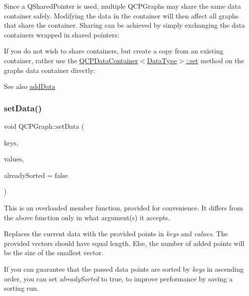 Since a Q\+Shared\+Pointer is used, multiple Q\+C\+P\+Graphs may share the same data container safely. Modifying the data in the container will then affect all graphs that share the container. Sharing can be achieved by simply exchanging the data containers wrapped in shared pointers\+: 
\begin{DoxyCodeInclude}
\end{DoxyCodeInclude}
 If you do not wish to share containers, but create a copy from an existing container, rather use the \hyperlink{class_q_c_p_data_container_ae7042bd534fc3ce7befa2ce3f790b5bf}{Q\+C\+P\+Data\+Container$<$\+Data\+Type$>$\+::set} method on the graph\textquotesingle{}s data container directly\+: 
\begin{DoxyCodeInclude}
\end{DoxyCodeInclude}
 \begin{DoxySeeAlso}{See also}
\hyperlink{class_q_c_p_graph_ae0555c0d3fe0fa7cb8628f88158d420f}{add\+Data} 
\end{DoxySeeAlso}
\mbox{\label{class_q_c_p_graph_a73578d786532132310a926c3cd529b29}} 
\subsubsection{\texorpdfstring{set\+Data()}{setData()}\hspace{0.1cm}{\footnotesize\ttfamily [2/2]}}
{\footnotesize\ttfamily void Q\+C\+P\+Graph\+::set\+Data (\begin{DoxyParamCaption}\item[{const Q\+Vector$<$ double $>$ \&}]{keys,  }\item[{const Q\+Vector$<$ double $>$ \&}]{values,  }\item[{bool}]{already\+Sorted = {\ttfamily false} }\end{DoxyParamCaption})}

This is an overloaded member function, provided for convenience. It differs from the above function only in what argument(s) it accepts.

Replaces the current data with the provided points in {\itshape keys} and {\itshape values}. The provided vectors should have equal length. Else, the number of added points will be the size of the smallest vector.

If you can guarantee that the passed data points are sorted by {\itshape keys} in ascending order, you can set {\itshape already\+Sorted} to true, to improve performance by saving a sorting run.

